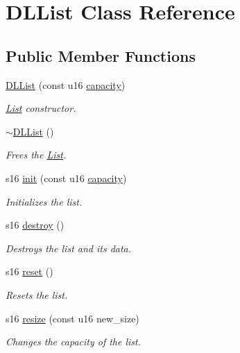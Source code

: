 \hypertarget{class_d_l_list}{}\section{D\+L\+List Class Reference}
\label{class_d_l_list}
\subsection*{Public Member Functions}
\begin{DoxyCompactItemize}
\item 
\hyperlink{class_d_l_list_ad67c39ec267f25ad501978f8e9557e91}{D\+L\+List} (const u16 \hyperlink{class_d_l_list_a7913658d122e6883ed7ddf3145567d67}{capacity})
\begin{DoxyCompactList}\small\item\em \hyperlink{class_list}{List} constructor. \end{DoxyCompactList}\item 
\hyperlink{class_d_l_list_af41d427d0901f856b267856007eb0eac}{$\sim$\+D\+L\+List} ()
\begin{DoxyCompactList}\small\item\em Frees the \hyperlink{class_list}{List}. \end{DoxyCompactList}\item 
s16 \hyperlink{class_d_l_list_aedbf4ff6aebd168e39d4c1534462c864}{init} (const u16 \hyperlink{class_d_l_list_a7913658d122e6883ed7ddf3145567d67}{capacity})
\begin{DoxyCompactList}\small\item\em Initializes the list. \end{DoxyCompactList}\item 
s16 \hyperlink{class_d_l_list_a09f41b245e07d6d57a4d5c7cc0df1ae8}{destroy} ()
\begin{DoxyCompactList}\small\item\em Destroys the list and it\textquotesingle{}s data. \end{DoxyCompactList}\item 
s16 \hyperlink{class_d_l_list_a444881340bdf15cb453bc1b2e61246bf}{reset} ()
\begin{DoxyCompactList}\small\item\em Resets the list. \end{DoxyCompactList}\item 
s16 \hyperlink{class_d_l_list_aa22c2c0ef5d27e8a0870e9b86efed78e}{resize} (const u16 new\+\_\+size)
\begin{DoxyCompactList}\small\item\em Changes the capacity of the list. \end{DoxyCompactList}\item 

\end{DoxyCompactItemize}
